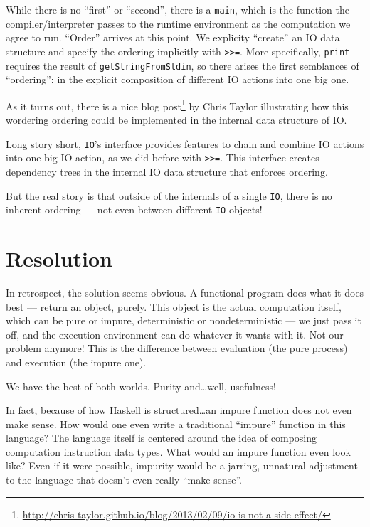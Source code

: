 \documentclass[]{article}
\renewcommand{\href}[2]{#2\footnote{\url{#1}}}
\begin{document}
While there is no ``first'' or ``second'', there is a \texttt{main}, which is the function the
compiler/interpreter passes to the runtime environment as the computation we agree to run. ``Order''
arrives at this point. We explicity ``create'' an IO data structure and specify the ordering
implicitly with \texttt{\textgreater{}\textgreater{}=}. More specifically, \texttt{print} requires
the result of \texttt{getStringFromStdin}, so there arises the first semblances of ``ordering'': in
the explicit composition of different IO actions into one big one.

As it turns out, there is a
\href{http://chris-taylor.github.io/blog/2013/02/09/io-is-not-a-side-effect/}{nice blog post} by
Chris Taylor illustrating how this wordering ordering could be implemented in the internal data
structure of IO.

Long story short, \texttt{IO}'s interface provides features to chain and combine IO actions into one
big IO action, as we did before with \texttt{\textgreater{}\textgreater{}=}. This interface creates
dependency trees in the internal IO data structure that enforces ordering.

But the real story is that outside of the internals of a single \texttt{IO}, there is no inherent
ordering --- not even between different \texttt{IO} objects!

\section{Resolution}\label{resolution}

In retrospect, the solution seems obvious. A functional program does what it does best --- return an
object, purely. This object is the actual computation itself, which can be pure or impure,
deterministic or nondeterministic --- we just pass it off, and the execution environment can do
whatever it wants with it. Not our problem anymore! This is the difference between evaluation (the
pure process) and execution (the impure one).

We have the best of both worlds. Purity and\ldots{}well, usefulness!

In fact, because of how Haskell is structured\ldots{}an impure function does not even make sense.
How would one even write a traditional ``impure'' function in this language? The language itself is
centered around the idea of composing computation instruction data types. What would an impure
function even look like? Even if it were possible, impurity would be a jarring, unnatural adjustment
to the language that doesn't even really ``make sense''.
\end{document}
